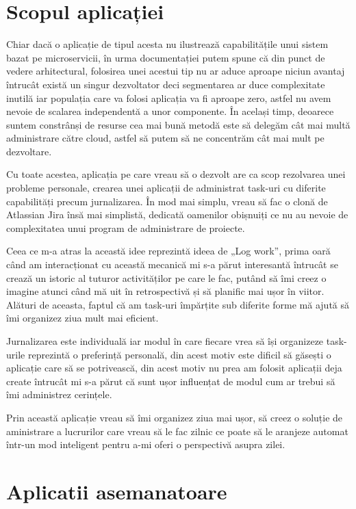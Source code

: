 \section{Scopul aplicației}

Chiar dacă o aplicație de tipul acesta nu ilustrează capabilitățile unui sistem
bazat pe microservicii, în urma documentației putem spune că din punct de
vedere arhitectural, folosirea unei acestui tip nu ar aduce
aproape niciun avantaj întrucât există un singur dezvoltator deci segmentarea
ar duce complexitate inutilă iar populația
care va folosi aplicația va fi aproape zero, astfel nu avem nevoie de scalarea
independentă a unor componente. În același timp, deoarece suntem constrânși de resurse
cea mai bună metodă este să delegăm cât mai multă administrare către cloud,
astfel să putem să ne concentrăm cât mai mult pe dezvoltare.

Cu toate acestea, aplicația pe care vreau să o dezvolt are ca scop rezolvarea
unei probleme personale, crearea unei aplicații de administrat task-uri cu diferite
capabilități precum jurnalizarea. În mod mai simplu, vreau să fac o clonă
de Atlassian Jira însă mai simplistă, dedicată oamenilor obișnuiți ce nu au nevoie
de complexitatea unui program de administrare de proiecte.

Ceea ce m-a atras la această idee reprezintă ideea de „Log work”, prima oară
când am interacționat cu această mecanică mi s-a părut interesantă întrucât
se crează un istoric al tuturor activităților pe care le fac, putând
să îmi creez o imagine atunci când mă uit în retrospectivă și să planific mai
ușor în viitor. Alături de aceasta, faptul că am task-uri împărțite sub diferite forme mă ajută
să îmi organizez ziua mult mai eficient.

Jurnalizarea este individuală iar modul în care fiecare vrea să își organizeze
task-urile reprezintă o preferință personală, din acest motiv este dificil să
găsești o aplicație care să se potrivească, din acest motiv nu prea am folosit aplicații
deja create întrucât mi s-a părut că sunt ușor influențat de modul cum ar trebui să
îmi administrez cerințele.

Prin această aplicație vreau să îmi organizez ziua mai ușor, să creez o soluție
de aministrare a lucrurilor care vreau să le fac zilnic ce poate să le aranjeze
automat într-un mod inteligent pentru a-mi oferi o perspectivă asupra zilei.

\section{Aplicatii asemanatoare}


